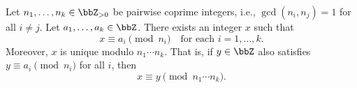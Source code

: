 \begin{theorem} \label{theorem:chinese_remainder_theorem_for_pairwise_coprime_moduli}
    Let $n_1, \dots, n_k \in \bbZ_{>0}$ be pairwise coprime integers, i.e., $\gcd(n_i, n_j) = 1$ for all $i \neq j$. Let $a_1, \dots, a_k \in \bbZ$. There exists an integer $x$ such that
    $$x \equiv a_i \pmod{n_i} \quad \text{for each } i = 1, \dots, k.$$
    Moreover, $x$ is unique modulo $n_1 \cdots n_k$. That is, if $y \in \bbZ$ also satisfies $y \equiv a_i \pmod{n_i}$ for all $i$, then
    $$x \equiv y \pmod{n_1 \cdots n_k}.$$
\end{theorem}

